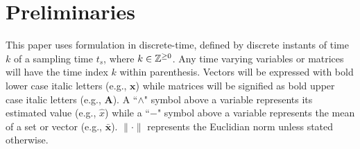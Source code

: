 
\section{Preliminaries} \label{sec:preliminaries}

This paper uses formulation in discrete-time, defined by discrete instants of time $k$ of a sampling time $t_s$, where $k \in \mathbb{Z}^{\geq0}$. Any time varying variables or matrices will have the time index $k$ within parenthesis. Vectors will be expressed with bold lower case italic letters (e.g., $\bm{x}$) while matrices will be signified as bold upper case italic letters (e.g., $\bm{A}$). A ``$\wedge$" symbol above a variable represents its estimated value (e.g., $\hat{x}$) while a ``$-$" symbol above a variable represents the mean of a set or vector (e.g., $\bar{\bm{x}}$). $\lVert\cdot\rVert$ represents the Euclidian norm unless stated otherwise.
